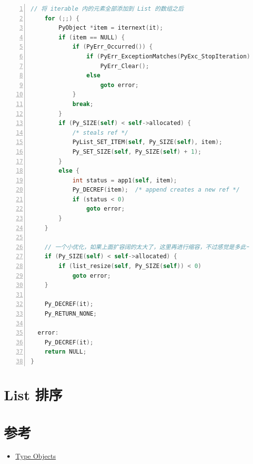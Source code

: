 \begin{lstlisting}[language=C, numbers=left, numbersep=1em, numberstyle=\footnotesize , breaklines=true]
    // 将 iterable 内的元素全部添加到 List 的数组之后
    for (;;) {
        PyObject *item = iternext(it);
        if (item == NULL) {
            if (PyErr_Occurred()) {
                if (PyErr_ExceptionMatches(PyExc_StopIteration))
                    PyErr_Clear();
                else
                    goto error;
            }
            break;
        }
        if (Py_SIZE(self) < self->allocated) {
            /* steals ref */
            PyList_SET_ITEM(self, Py_SIZE(self), item);
            Py_SET_SIZE(self, Py_SIZE(self) + 1);
        }
        else {
            int status = app1(self, item);
            Py_DECREF(item);  /* append creates a new ref */
            if (status < 0)
                goto error;
        }
    }

    // 一个小优化，如果上面扩容阔的太大了，这里再进行缩容，不过感觉是多此一举
    if (Py_SIZE(self) < self->allocated) {
        if (list_resize(self, Py_SIZE(self)) < 0)
            goto error;
    }

    Py_DECREF(it);
    Py_RETURN_NONE;

  error:
    Py_DECREF(it);
    return NULL;
}
\end{lstlisting}

\section{List 排序}



\section{参考}

\begin{itemize}
\item \href{https://docs.python.org/3/c-api/typeobj.html}{Type Objects}
\end{itemize}



